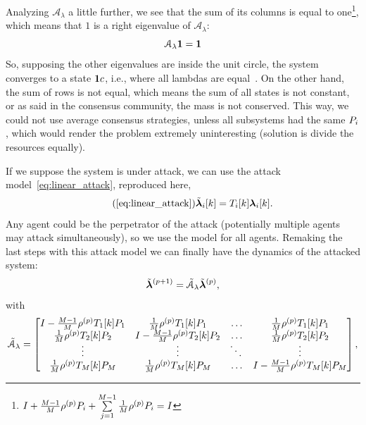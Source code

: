 \documentclass[../main.tex]{subfiles}
\begin{document}
Analyzing $\mathcal{A}_{\lambda}$ a little further, we see that the sum of its columns is equal to one\footnote{$I+\frac{M-1}{M}\rho^{(p)} {P}_{i}+\sum\limits_{j=1}^{M-1}\frac{1}{M}\rho^{(p)} {P}_{i}=I$},
which means that $1$ is a right eigenvalue of $\mathcal{A}_{\lambda}$:
\begin{equation*}
  \mathcal{A}_{\lambda}\mathbf{1}=\mathbf{1}
\end{equation*}
So, supposing the other eigenvalues are inside the unit circle, the system converges to a state $\mathbf{1}c$, i.e., where all lambdas are equal~\cite{GarinSchenato2010,XiaoEtAl2007}.
On the other hand, the sum of rows is not equal, which means the sum of all states is not constant, or as said in the consensus community, the mass is not conserved.
This way, we could not use average consensus strategies, unless all subsystems had the same ${P}_{i}$, which would render the problem extremely uninteresting (solution is divide the resources equally).

If we suppose the system is under attack, we can use the attack model~\eqref{eq:linear_attack}, reproduced here,
\begin{equation}
  \label{eq:linear_attack_reprise}
  \tag{\ref*{eq:linear_attack}}
  \lambdaicheat[k]=\Tik\lambdaik.
\end{equation}
Any agent could be the perpetrator of the attack (potentially multiple agents may attack simultaneously), so we use the model for all agents.
Remaking the last steps with this attack model we can finally have the dynamics of the attacked system:
\begin{equation}
  \label{eq:negotiation_equation_substituting_organizing_under_attack}
  \tilde{\boldsymbol{\lambda}}^{(p+1)}=\tilde{\mathcal{A}}_{\lambda}\tilde{\boldsymbol{\lambda}}^{(p)},
\end{equation}
with
\begin{equation}
\tilde{\mathcal{A}}_{\lambda}=\left[
\begin{matrix}
I-\frac{M-1}{M}\rho\p \Tik[1]\Plin[1] & \frac{1}{M}\rho\p \Tik[1]\Plin[1]&\dots&\frac{1}{M}\rho\p \Tik[1]\Plin[1]\\
\frac{1}{M}\rho\p \Tik[2]\Plin[2]&I-\frac{M-1}{M}\rho\p \Tik[2]\Plin[2]&\dots&\frac{1}{M}\rho\p \Tik[2]\Plin[2]\\
\vdots&\vdots&\ddots&\vdots\\
\frac{1}{M}\rho\p \Tik[M]\Plin[M]&\frac{1}{M}\rho\p \Tik[M]\Plin[M]&\dots&I-\frac{M-1}{M}\rho\p \Tik[M]\Plin[M]\\
\end{matrix}
\right],
\end{equation}
\end{document}

